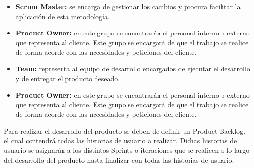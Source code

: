 \begin{itemize}

	\item \textbf{Scrum Master:} se encarga de gestionar los cambios y procura facilitar la aplicación de esta metodología.
	
	\item \textbf{Product Owner:} en este grupo se encontrarán el personal interno o externo que representa al cliente. Este grupo se encargará de que el trabajo se realice de forma acorde con las necesidades y peticiones del cliente.
	
	\item \textbf{Team:} representa al equipo de desarrollo encargados de ejecutar el desarrollo y de entregar el producto deseado.
	
	\item \textbf{Product Owner:} en este grupo se encontrarán el personal interno o externo que representa al cliente. Este grupo se encargará de que el trabajo se realice de forma acorde con las necesidades y peticiones del cliente.	

\end{itemize}
\cite{wiki:scrum}
 
Para realizar el desarrollo del producto se deben de definir un Product Backlog, el cual contendrá todas las historias de usuario a realizar. Dichas historias de usuario se asignarán a los distintos Sprints o iteraciones que se realicen a lo largo del desarrollo del producto hasta finalizar con todas las historias de usuario. 










